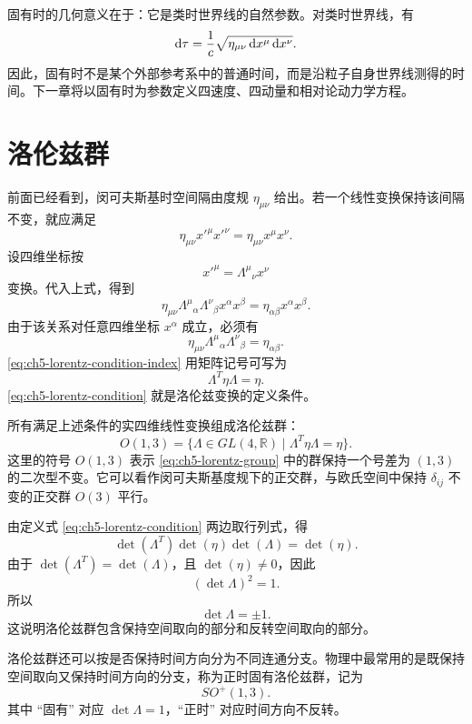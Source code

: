 固有时的几何意义在于：它是类时世界线的自然参数。对类时世界线，有
\[
\mathop{}\!\mathrm{d}\tau=\frac{1}{c}\sqrt{\eta_{\mu\nu}\mathop{}\!\mathrm{d} x^{\mu}\mathop{}\!\mathrm{d} x^{\nu}}.
\]
因此，固有时不是某个外部参考系中的普通时间，而是沿粒子自身世界线测得的时间。下一章将以固有时为参数定义四速度、四动量和相对论动力学方程。


\section{洛伦兹群}

前面已经看到，闵可夫斯基时空间隔由度规 $\eta_{\mu\nu}$ 给出。若一个线性变换保持该间隔不变，就应满足
\[
\eta_{\mu\nu}x'^{\mu}x'^{\nu}
=
\eta_{\mu\nu}x^{\mu}x^{\nu}.
\]
设四维坐标按
\[
x'^{\mu}
=
\Lambda^{\mu}{}_{\nu}x^{\nu}
\]
变换。代入上式，得到
\[
\eta_{\mu\nu}
\Lambda^{\mu}{}_{\alpha}
\Lambda^{\nu}{}_{\beta}
x^{\alpha}x^{\beta}
=
\eta_{\alpha\beta}x^{\alpha}x^{\beta}.
\]
由于该关系对任意四维坐标 $x^{\alpha}$ 成立，必须有
\begin{equation}
\label{eq:ch5-lorentz-condition-index}
\eta_{\mu\nu}
\Lambda^{\mu}{}_{\alpha}
\Lambda^{\nu}{}_{\beta}
=
\eta_{\alpha\beta}.
\end{equation}
\eqref{eq:ch5-lorentz-condition-index} 用矩阵记号可写为
\begin{equation}
\label{eq:ch5-lorentz-condition}
\Lambda^{T}\eta\Lambda
=
\eta.
\end{equation}
\eqref{eq:ch5-lorentz-condition} 就是洛伦兹变换的定义条件。

所有满足上述条件的实四维线性变换组成洛伦兹群：
\begin{equation}
\label{eq:ch5-lorentz-group}
O(1,3)
=
\{\Lambda\in GL(4,\mathbb{R})\mid \Lambda^{T}\eta\Lambda=\eta\}.
\end{equation}
这里的符号 $O(1,3)$ 表示 \eqref{eq:ch5-lorentz-group} 中的群保持一个号差为 $(1,3)$ 的二次型不变。它可以看作闵可夫斯基度规下的正交群，与欧氏空间中保持 $\delta_{ij}$ 不变的正交群 $O(3)$ 平行。

由定义式 \eqref{eq:ch5-lorentz-condition} 两边取行列式，得
\[
\det(\Lambda^{T})\det(\eta)\det(\Lambda)
=
\det(\eta).
\]
由于 $\det(\Lambda^{T})=\det(\Lambda)$，且 $\det(\eta)\neq 0$，因此
\[
(\det\Lambda)^{2}=1.
\]
所以
\[
\det\Lambda=\pm 1.
\]
这说明洛伦兹群包含保持空间取向的部分和反转空间取向的部分。

洛伦兹群还可以按是否保持时间方向分为不同连通分支。物理中最常用的是既保持空间取向又保持时间方向的分支，称为正时固有洛伦兹群，记为
\[
SO^{+}(1,3).
\]
其中 “固有” 对应 $\det\Lambda=1$，“正时” 对应时间方向不反转。

